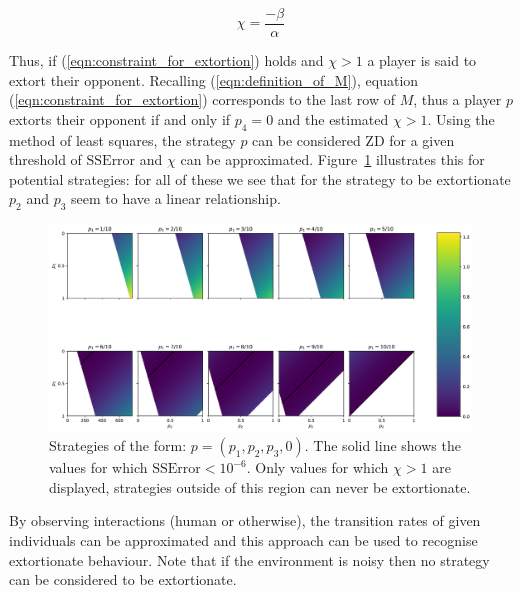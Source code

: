 \documentclass[a4paper]{article}
\begin{document}
\begin{equation}\label{eqn:definition_of_chi}
    \chi=\frac{-\beta}{\alpha}
\end{equation}

Thus, if (\ref{eqn:constraint_for_extortion}) holds and \(\chi >1\) a player is
said to extort their opponent. Recalling (\ref{eqn:definition_of_M}), equation
(\ref{eqn:constraint_for_extortion}) corresponds to the last row of \(M\), thus
a player \(p\) extorts their opponent if and only if \(p_4=0\) and the estimated
\(\chi > 1\). Using the method of least squares, the strategy \(p\) can be
considered ZD for a given threshold of \(\text{SSError}\) and \(\chi\) can be
approximated.  Figure~\ref{fig:examples_of_extortion} illustrates this for
potential strategies: for all of these we see that for the strategy to be
extortionate \(p_2\) and \(p_3\) seem to have a linear relationship.

\begin{figure}[!htbp]
    \begin{center}
        \includegraphics[width=\textwidth]{assets/img/examples_of_extortion/main.pdf}
        \caption{Strategies of the form:
                 \(p=(p_1, p_2, p_3, 0)\). The solid line shows the values for
                 which \(\text{SSError} < 10 ^ {-6}\). Only values for which \(\chi > 1\) are
                 displayed, strategies outside of this region can never be
                 extortionate.}
        \label{fig:examples_of_extortion}
    \end{center}
\end{figure}

By observing interactions (human or otherwise), the transition rates of given
individuals can be approximated and this approach can be used to recognise
extortionate behaviour. Note that if the environment is noisy then no strategy
can be considered to be extortionate.
\end{document}
